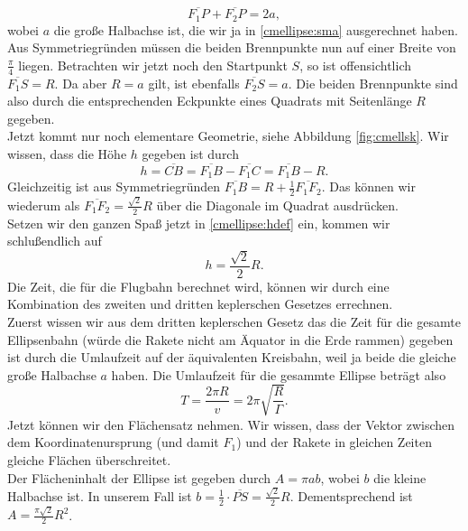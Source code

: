 \begin{Answer}[ref = cmellipse]
	\begin{equation}\label{cmellipse:edef}
	\overline{F_1P} + \overline{F_2P} = 2a,
	\end{equation}
	wobei $a$ die große Halbachse ist, die wir ja in \eqref{cmellipse:sma} ausgerechnet haben.\\
	Aus Symmetriegründen müssen die beiden Brennpunkte nun auf einer Breite von $\frac{\pi}{4}$ liegen. Betrachten wir jetzt noch den Startpunkt $S$, so ist offensichtlich $\overline{F_1S}= R$. Da aber $R=a$ gilt, ist ebenfalls $\overline{F_2S} = a$. Die beiden Brennpunkte sind also durch die entsprechenden Eckpunkte eines Quadrats mit Seitenlänge $R$  gegeben.\\
	Jetzt kommt nur noch elementare Geometrie, siehe Abbildung \ref{fig:cmellsk}. Wir wissen, dass die Höhe $h$ gegeben ist durch 
	\begin{equation}\label{cmellipse:hdef}
		h = \overline{CB} = \overline{F_1B} - \overline{F_1C} =  \overline{F_1B} - R.
	\end{equation}
	Gleichzeitig ist aus Symmetriegründen $\overline{F_1B} = R + \frac{1}{2}\overline{F_1F_2}$. Das können wir wiederum als $\overline{F_1F_2} = \frac{\sqrt{2}}{2}R$ über die Diagonale im Quadrat ausdrücken.\\
	Setzen wir den ganzen Spaß jetzt in \eqref{cmellipse:hdef} ein, kommen wir schlußendlich auf
	\begin{equation}\label{cmellipse:maxh}
		\boxed{h = \frac{\sqrt{2}}{2}R.}
	\end{equation}
	\Question Die Zeit, die für die Flugbahn berechnet wird, können wir durch eine Kombination des zweiten und dritten keplerschen Gesetzes errechnen. \\
	Zuerst wissen wir aus dem dritten keplerschen Gesetz das die Zeit für die gesamte Ellipsenbahn (würde die Rakete nicht am Äquator in die Erde rammen) gegeben ist durch die Umlaufzeit auf der äquivalenten Kreisbahn, weil ja beide die gleiche große Halbachse $a$ haben. Die Umlaufzeit für die gesammte Ellipse beträgt also
	\begin{equation}\label{cmellipse:tfull}
		T = \frac{2\pi R}{v} = 2\pi \sqrt{\frac{R}{{\Gamma}}}.
	\end{equation}
	Jetzt können wir den Flächensatz nehmen. Wir wissen, dass der Vektor zwischen dem Koordinatenursprung (und damit $F_1$) und der Rakete in gleichen Zeiten gleiche Flächen überschreitet.\\
	Der Flächeninhalt der Ellipse ist gegeben durch $A = \pi ab$, wobei $b$ die kleine Halbachse ist. In unserem Fall ist $b = \frac{1}{2}\cdot \overline{PS}  = \frac{\sqrt{2}}{2}R$. Dementsprechend ist $A = \frac{\pi\sqrt{2}}{2}R^2$.\\

\end{Answer}
